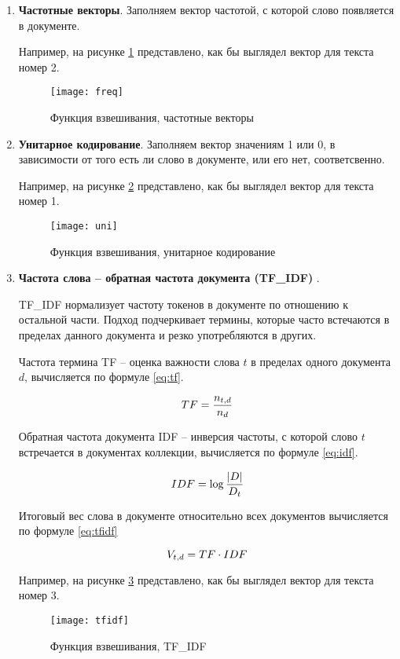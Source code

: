 \begin{enumerate}
\item[1.] \textbf{Частотные векторы}.
Заполняем вектор частотой, с которой слово появляется в документе.

Например, на рисунке \ref{img:freq} представлено, как бы выглядел вектор для текста номер 2.

\begin{figure}[H]
	\centering
	\texttt{[image: freq]}
	\caption{Функция взвешивания, частотные векторы }
	\label{img:freq}
\end{figure}

\item[2.] \textbf{Унитарное кодирование}.
Заполняем вектор значениям 1 или 0, в зависимости от того есть ли слово в документе, или его нет, соответсвенно.

Например, на рисунке \ref{img:uni} представлено, как бы выглядел вектор для текста номер 1.

\begin{figure}[H]
	\centering
	\texttt{[image: uni]}
	\caption{Функция взвешивания, унитарное кодирование }
	\label{img:uni}
\end{figure}

\item[3.] \textbf{Частота слова -- обратная частота документа (TF\_IDF)} \cite{classes}.

TF\_IDF нормализует частоту токенов в документе по отношению к остальной части. Подход подчеркивает термины, которые часто встечаются в пределах данного документа и резко употребляются в других.

Частота термина TF -- оценка важности слова $t$ в пределах одного документа $d$, вычисляется по формуле \ref{eq:tf}.

\begin{equation}
	\centering
	TF = \frac{n_{t,d}}{n_d}
	\label{eq:tf}
\end{equation}

Обратная частота документа IDF -- инверсия частоты, с которой слово $t$ встречается в документах коллекции, вычисляется по формуле \ref{eq:idf}.

\begin{equation}
	\centering
	IDF = \log{\frac{|D|}{D_t}}
	\label{eq:idf}
\end{equation}

Итоговый вес слова в документе относительно всех документов вычисляется по формуле \ref{eq:tfidf}

\begin{equation}
	\centering
	V_{t,d} =TF \cdot IDF
	\label{eq:tfidf}
\end{equation}

Например, на рисунке \ref{img:tfidf} представлено, как бы выглядел вектор для текста номер 3.

\begin{figure}[H]
	\centering
	\texttt{[image: tfidf]}
	\caption{Функция взвешивания, TF\_IDF }
	\label{img:tfidf}
\end{figure}
\end{enumerate}

